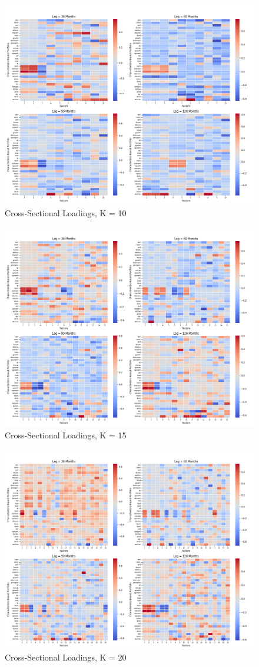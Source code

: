 \documentclass{article}
\begin{document}
\begin{figure}[H]
    \centering
    \includegraphics[width=0.85\linewidth]{B_10.png}
    \caption{Cross-Sectional Loadings, K = 10}
    \label{fig:B_10}
\end{figure}
\begin{figure}[H]
    \centering
    \includegraphics[width=0.85\linewidth]{B_15.png}
    \caption{Cross-Sectional Loadings, K = 15}
    \label{fig:B_15}
\end{figure}
\begin{figure}[H]
    \centering
    \includegraphics[width=0.85\linewidth]{B_20.png}
    \caption{Cross-Sectional Loadings, K = 20}
    \label{fig:B_20}
\end{figure}
\end{document}

